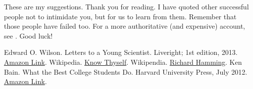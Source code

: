 \documentclass[12pt]{article}
\begin{document}
These are my suggestions. Thank you for reading. I have quoted other successful people not to intimidate you, but for us to learn from them. Remember that those people have failed too. For a more authoritative (and expensive) account, see \cite{ken-bain}. Good luck!

\begin{thebibliography}{00}
     Edward O. Wilson. Letters to a Young Scientist. Liveright; 1st edition, 2013. \href{https://www.amazon.in/Letters-Young-Scientist-Edward-Wilson-ebook/dp/B00AR3551Y}{Amazon Link}.
     Wikipedia. \href{https://en.wikipedia.org/wiki/Know_thyself}{Know Thyself}.
     Wikipendia. \href{https://en.wikipedia.org/wiki/Richard_Hamming}{Richard Hamming}.
     Ken Bain. What the Best College Students Do. Harvard University Press, July 2012. \href{https://www.amazon.in/What-Best-College-Students-Do-ebook/dp/B008L42UJ6}{Amazon Link}.
\end{thebibliography}
\end{document}
